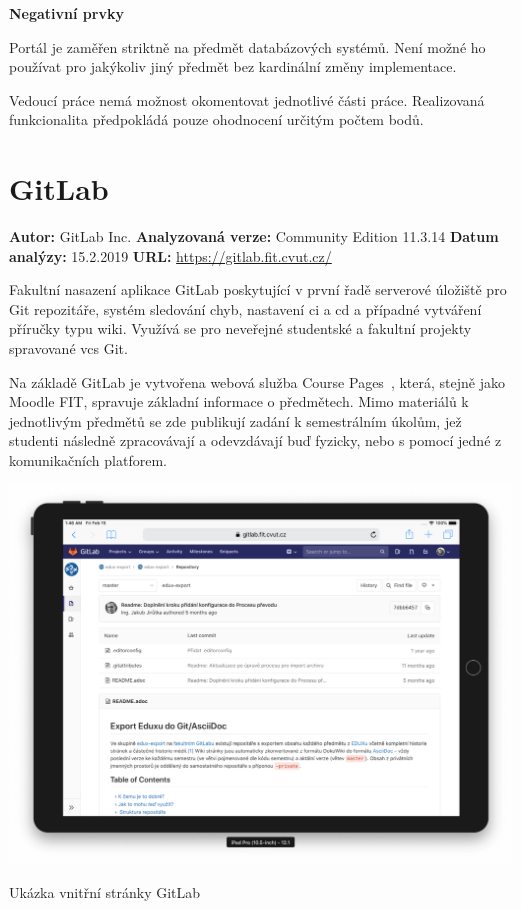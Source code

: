 \textbf{Negativní prvky}
\begin{ul}
   \item Portál je zaměřen striktně na předmět databázových systémů. Není možné ho používat pro jakýkoliv jiný předmět bez kardinální změny implementace.
   \item Vedoucí práce nemá možnost okomentovat jednotlivé části práce. Realizovaná funkcionalita předpokládá pouze ohodnocení určitým počtem bodů.
\end{ul}



\clearpage
\section{GitLab}

\textbf{Autor:} GitLab Inc.\newline
\textbf{Analyzovaná verze:} Community Edition 11.3.14\newline
\textbf{Datum analýzy:} 15.2.2019\newline
\textbf{URL:} \url{https://gitlab.fit.cvut.cz/}

Fakultní nasazení aplikace GitLab poskytující v první řadě serverové úložiště pro Git repozitáře, systém sledování chyb, nastavení \gls{ci} a \gls{cd} a případné vytváření příručky typu wiki. Využívá se pro neveřejné studentské a fakultní projekty spravované \gls{vcs} Git.

Na základě GitLab je vytvořena webová služba Course Pages~\cite{courses}, která, stejně jako Moodle FIT, spravuje základní informace o předmětech. Mimo materiálů k jednotlivým předmětů se zde publikují zadání k semestrálním úkolům, jež studenti následně zpracovávají a odevzdávají buď fyzicky, nebo s pomocí jedné z komunikačních platforem.

\begin{fig:illustration}
   \includegraphics[width=1\textwidth]{images/analyza-gitlab.png}
   \caption{Ukázka vnitřní stránky GitLab}\label{pic:analyza-gitlab}
\end{fig:illustration}

